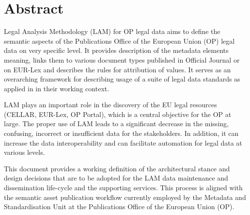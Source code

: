 \section*{Abstract}

	Legal Analysis Methodology (LAM) for OP legal data aims to define the semantic aspects of the Publications Office of the European Union (OP) legal data on very specific level. It provides description of the metadata elements meaning, links them to various document types published in Official Journal or on EUR-Lex and describes the rules for attribution of values. It serves as an overarching framework for describing usage of a suite of legal data standards as applied in in their working context. 
	
	LAM plays an important role in the discovery of the EU legal resources (CELLAR, EUR-Lex, OP Portal), which is a central objective for the OP at large. The proper use of LAM leads to a significant decrease in the missing, confusing, incorrect or insufficient data for the stakeholders. In addition, it can increase the data interoperability and can facilitate automation for legal data at various levels.

    This document provides a working definition of the architectural stance and design decisions that are to be adopted for the LAM data maintenance and dissemination life-cycle and the supporting services. This process is aligned with the semantic asset publication workflow currently employed by the Metadata and Standardisation Unit at the Publications Office of the European Union (OP).